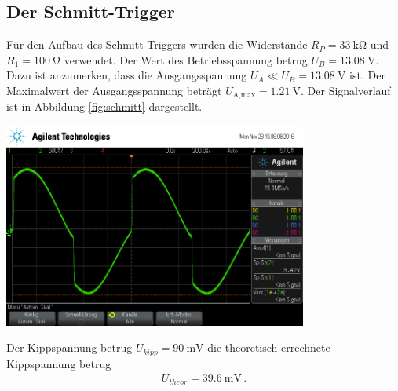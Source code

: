 \documentclass[]{scrartcl}
\begin{document}
\subsection{Der Schmitt-Trigger}
Für den Aufbau des Schmitt-Triggers wurden die Widerstände $R_P=\SI{33}{\kilo\ohm}$ und $R_1=\SI{100}{\ohm}$ verwendet. Der Wert des Betriebsspannung betrug $U_B=\SI{13.08}{\volt}$. Dazu ist anzumerken, dass  die Ausgangsspannung $U_A\ll U_B=\SI{13.08}{\volt}$ ist. Der Maximalwert der Ausgangsspannung beträgt $U_{\text{A,max}}=\SI{1.21}{\volt}$. Der Signalverlauf ist in Abbildung \ref{fig:schmitt} dargestellt.\\
\begin{center}
	\includegraphics[width=10cm]{images/schmitt.png}
	\label{fig:schmitt}
\end{center}
Der Kippspannung betrug $U_{kipp}=\SI{90}{\milli\volt}$ die theoretisch errechnete Kippspannung betrug
\begin{align*}
U_{theor}=\SI{39.6}{\milli\volt}\,.
\end{align*}
\end{document}
